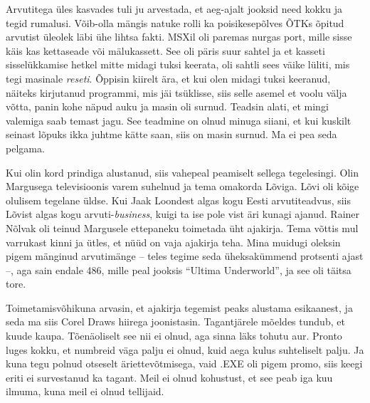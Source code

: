 Arvutitega üles kasvades tuli ju arvestada, et aeg-ajalt 
jooksid need kokku ja tegid rumalusi. Võib-olla mängis natuke 
rolli ka poisikesepõlves ÕTKs õpitud arvutist üleolek läbi ühe lihtsa fakti. 
MSXil oli paremas nurgas port, mille sisse käis kas 
kettaseade või mälukassett. See oli päris suur 
sahtel ja et kasseti sisselükkamise hetkel mitte midagi tuksi 
keerata, oli sahtli sees väike lüliti, mis tegi masinale \emph{reseti}. 
Õppisin kiirelt ära, et kui olen midagi tuksi keeranud, näiteks 
kirjutanud programmi, mis jäi tsüklisse, siis selle asemel et voolu välja 
võtta, panin kohe näpud auku ja masin oli surnud. Teadsin alati, et 
mingi valemiga saab temast jagu. See teadmine on olnud minuga siiani, et kui 
kuskilt seinast lõpuks ikka juhtme kätte saan, siis on masin surnud. Ma ei pea 
seda pelgama.


Kui olin kord prindiga alustanud, siis vahepeal peamiselt sellega tegelesingi. 
Olin 
Margusega televisioonis varem suhelnud ja tema omakorda 
Lõviga. Lõvi oli kõige olulisem 
tegelane üldse. Kui Jaak Loondest algas kogu Eesti 
arvutiteadvus, siis 
Lõvist algas kogu arvuti-\emph{business}, kuigi ta ise pole vist 
äri kunagi ajanud. 
Rainer Nõlvak oli teinud Margusele ettepaneku 
toimetada üht ajakirja. Tema võttis mul varrukast kinni ja ütles, 
et nüüd on vaja ajakirja teha. Mina muidugi oleksin pigem 
mänginud arvutimänge -- teles tegime seda üheksakümmend 
protsenti ajast --, aga sain endale 486, mille peal jooksis \enquote{Ultima 
Underworld}, ja 
see oli täitsa tore. 

Toimetamisvõhikuna arvasin, et ajakirja tegemist peaks alustama 
esikaanest, ja seda ma siis Corel Draws hiirega 
joonistasin. Tagantjärele mõeldes tundub, et 
kuude kaupa. Tõenäoliselt see nii ei olnud, aga sinna läks tohutu aur. 
Pronto luges kokku, et numbreid väga palju ei olnud, kuid 
aega kulus 
suhteliselt palju. Ja kuna tegu polnud otseselt 
äriettevõtmisega, vaid .EXE oli pigem promo, siis keegi eriti ei 
survestanud ka tagant. Meil ei olnud kohustust, et see peab iga kuu ilmuma, 
kuna meil ei olnud 
tellijaid.

